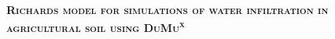 {
\begin{frame}

	\color{c++reviewduneblue}

	\begin{flushleft}\bfseries\scshape\huge
		Richards model for simulations of water infiltration in agricultural soil using DuMu\textsuperscript{x}
	\end{flushleft}

	\

	\

	\

	\

	\

	\


\end{frame}}

